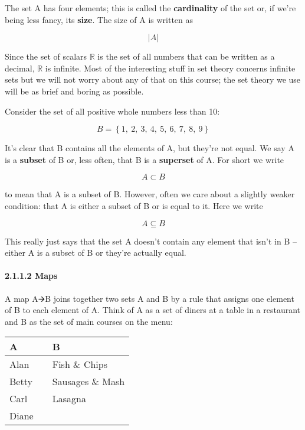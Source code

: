 \documentclass[oneside,english]{amsbook}
\numberwithin{section}{chapter}
\theoremstyle{plain}
\theoremstyle{definition}
\begin{document}
The set A has four elements; this is called the \textbf{cardinality} of
the set or, if we're being less fancy, its \textbf{size}. The size of A
is written as

\[|A|\]

Since the set of scalars $\mathbb{R}$ is the set of all numbers that can
be written as a decimal, \textbar{}$\mathbb{R}$\textbar{} is infinite.
Most of the interesting stuff in set theory concerns infinite sets but
we will not worry about any of that on this course; the set theory we
use will be as brief and boring as possible.

Consider the set of all positive whole numbers less than 10:

\[B = \left\{ 1,\ 2,\ 3,\ 4,\ 5,\ 6,\ 7,\ 8,\ 9 \right\}\]

It's clear that B contains all the elements of A, but they're not equal.
We say A is a \textbf{subset} of B or, less often, that B is a
\textbf{superset} of A. For short we write

\[A \subset B\]

to mean that A is a subset of B. However, often we care about a slightly
weaker condition: that A is either a subset of B or is equal to it. Here
we write

\[A \subseteq B\]

This really just says that the set A doesn't contain any element that
isn't in B -- either A is a subset of B or they're actually equal.

\paragraph{2.1.1.2 Maps}\label{maps}

A map A🡪B joins together two sets A and B by a rule that assigns one
element of B to each element of A. Think of A as a set of diners at a
table in a restaurant and B as the set of main courses on the menu:

\begin{longtable}[]{@{}
		>{\centering\arraybackslash}p{}
		>{\centering\arraybackslash}p{}
		>{\centering\arraybackslash}p{}@{}}
	\toprule\noalign{}
	\begin{minipage}[b]{\linewidth}\centering
		\textbf{A}
	\end{minipage} & \begin{minipage}[b]{\linewidth}\centering
	\end{minipage} & \begin{minipage}[b]{\linewidth}\centering
		\textbf{B}
	\end{minipage} \\
	\midrule\noalign{}
	\endhead
	\bottomrule\noalign{}
	\endlastfoot
	Alan & & Fish \& Chips \\
	Betty & & Sausages \& Mash \\
	Carl & & Lasagna \\
	Diane & & \\
\end{longtable}
\end{document}
